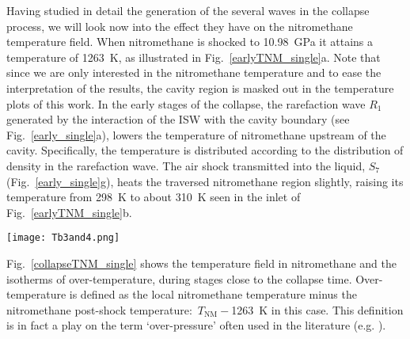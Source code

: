 \documentclass[3p,times,twocolumn]{elsarticle}
\begin{document}
Having studied in detail the generation of the several waves in the collapse process, we will look now into the effect they have on the nitromethane temperature field. 
When nitromethane is shocked to \SI{10.98}{\giga \pascal}  it attains a temperature
 of  \SI{1263}{\kelvin}, as illustrated in Fig.\  \ref{earlyTNM_single}a. 
Note that since we are only interested in the nitromethane temperature and to ease
the interpretation of the results, the cavity region is masked out  in the
temperature plots of this work. In the early stages of the collapse, the
 rarefaction wave $R_1$ generated by the interaction of the ISW with the
cavity boundary (see Fig.\  \ref{early_single}a), lowers  the temperature
of nitromethane upstream of the cavity. Specifically, the temperature is
distributed according to the distribution of density in the rarefaction wave.
The air shock transmitted into the liquid,  $S_7$ (Fig.\  \ref{early_single}g),
heats the traversed nitromethane region slightly, raising its temperature
from \SI{298}{\kelvin} to about \SI{310}{\kelvin} seen in the inlet of Fig.\  \ref{earlyTNM_single}b.

\begin{figure*}[t]
    \centering
\texttt{[image: Tb3and4.png]}
\caption{Temperature distribution of nitromethane on the $xz$-plane through
the centre of the cavity, close to collapse time. The contours represent
isotherms of over-temperature, which have are meaningful only after the
cavity collapses. The horizontal axis represents
$x$  and the vertical axis $z$, both  in \SI{}{\micro \meter}.}
\label{collapseTNM_single}
\end{figure*}
Fig.\  \ref{collapseTNM_single} shows the temperature field in nitromethane
and the  isotherms of over-temperature, during stages close to the collapse
time. Over-temperature is defined as the local nitromethane temperature minus
the nitromethane post-shock temperature:\  $T_{\text{NM}}-$\SI{1263}{\kelvin} in
this case. This definition is in fact a play on the term `over-pressure' often used in the literature (e.g. \cite{kapila2015numerical}).
\end{document}
